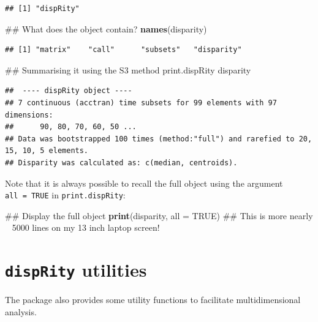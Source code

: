 \documentclass[]{book}
\newenvironment{Shaded}{\begin{snugshade}}{\end{snugshade}}
\newcommand{\KeywordTok}[1]{\textcolor[rgb]{0.13,0.29,0.53}{\textbf{#1}}}
\newcommand{\DataTypeTok}[1]{\textcolor[rgb]{0.13,0.29,0.53}{#1}}
\newcommand{\OtherTok}[1]{\textcolor[rgb]{0.56,0.35,0.01}{#1}}
\newcommand{\NormalTok}[1]{#1}
\theoremstyle{definition}
\theoremstyle{definition}
\theoremstyle{definition}
\theoremstyle{remark}
\begin{document}
\begin{verbatim}
## [1] "dispRity"
\end{verbatim}

\begin{Shaded}
\begin{Highlighting}[]
\NormalTok{## What does the object contain?}
\KeywordTok{names}\NormalTok{(disparity)}
\end{Highlighting}
\end{Shaded}

\begin{verbatim}
## [1] "matrix"    "call"      "subsets"   "disparity"
\end{verbatim}

\begin{Shaded}
\begin{Highlighting}[]
\NormalTok{## Summarising it using the S3 method print.dispRity}
\NormalTok{disparity}
\end{Highlighting}
\end{Shaded}

\begin{verbatim}
##  ---- dispRity object ---- 
## 7 continuous (acctran) time subsets for 99 elements with 97 dimensions:
##      90, 80, 70, 60, 50 ...
## Data was bootstrapped 100 times (method:"full") and rarefied to 20, 15, 10, 5 elements.
## Disparity was calculated as: c(median, centroids).
\end{verbatim}

Note that it is always possible to recall the full object using the
argument \texttt{all\ =\ TRUE} in \texttt{print.dispRity}:

\begin{Shaded}
\begin{Highlighting}[]
\NormalTok{## Display the full object}
\KeywordTok{print}\NormalTok{(disparity, }\DataTypeTok{all =} \OtherTok{TRUE}\NormalTok{)}
\NormalTok{## This is more nearly ~ 5000 lines on my 13 inch laptop screen!}
\end{Highlighting}
\end{Shaded}

\section{\texorpdfstring{\texttt{dispRity}
utilities}{dispRity utilities}}\label{disprity-utilities}

The package also provides some utility functions to facilitate
multidimensional analysis.
\end{document}
